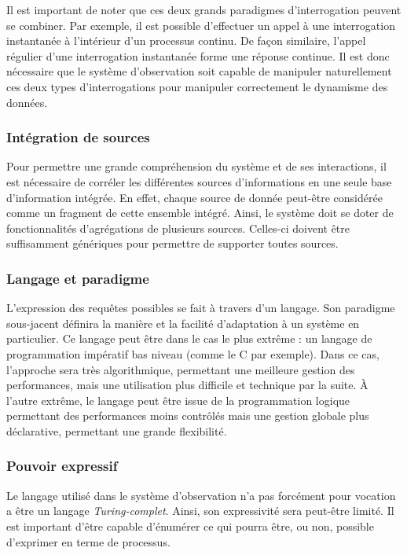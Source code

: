 Il est important de noter que ces deux grands paradigmes d'interrogation peuvent se combiner. Par exemple, il est possible d'effectuer un appel à une interrogation instantanée à l'intérieur d'un processus continu. De façon similaire, l'appel régulier d'une interrogation instantanée forme une réponse continue. Il est donc nécessaire que le système d'observation soit capable de manipuler naturellement ces deux types d'interrogations pour manipuler correctement le dynamisme des données.

\subsubsection{Intégration de sources}
Pour permettre une grande compréhension du système et de ses interactions, il est nécessaire de corréler les différentes sources d'informations en une seule base d'information intégrée. En effet, chaque source de donnée peut-être considérée comme un fragment de cette ensemble intégré. Ainsi, le système doit se doter de fonctionnalités d'agrégations de plusieurs sources. Celles-ci doivent être suffisamment génériques pour permettre de supporter toutes sources.

\subsubsection{Langage et paradigme}
L'expression des requêtes possibles se fait à travers d'un langage. Son paradigme sous-jacent définira la manière et la facilité d'adaptation à un système en particulier. Ce langage peut être dans le cas le plus extrême : un langage de programmation impératif bas niveau (comme le C par exemple). Dans ce cas, l'approche sera très algorithmique, permettant une meilleure gestion des performances, mais une utilisation plus difficile et technique par la suite. À l'autre extrême, le langage peut être issue de la programmation logique permettant des performances moins contrôlés mais une gestion globale plus déclarative, permettant une grande flexibilité.

\subsubsection{Pouvoir expressif}
Le langage utilisé dans le système d'observation n'a pas forcément pour vocation a être un langage \textit{Turing-complet}. Ainsi, son expressivité sera peut-être limité. Il est important d'être capable d'énumérer ce qui pourra être, ou non, possible d'exprimer en terme de processus.

